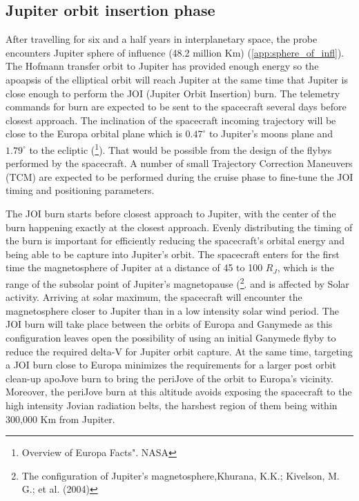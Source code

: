 \subsection{Jupiter orbit insertion phase}
After travelling for six and a half years in interplanetary space, the probe encounters Jupiter sphere of influence (48.2 million Km) (\ref{app:sphere_of_infl}). The Hofmann transfer orbit to Jupiter has provided enough energy so the apoapsis of the elliptical orbit will reach Jupiter at the same time that Jupiter is close enough to perform the JOI (Jupiter Orbit Insertion) burn. The telemetry commands for burn are expected to be sent to the spacecraft several days before closest approach. The inclination of the spacecraft incoming trajectory will be close to the Europa orbital plane which is $0.47^\circ$ to Jupiter’s moons plane and $1.79^\circ$ to the ecliptic (\footnote{Overview of Europa Facts". NASA}). That would be possible from the design of the flybys performed by the spacecraft. A number of small Trajectory Correction Maneuvers (TCM) are expected to be performed during the cruise phase to fine-tune the JOI timing and positioning parameters.

The JOI burn starts before closest approach to Jupiter, with the center of the burn happening exactly at the closest approach. Evenly distributing the timing of the burn is important for efficiently reducing the spacecraft’s orbital energy and being able to be capture into Jupiter's orbit. The spacecraft enters for the first time the magnetosphere of Jupiter at a distance of 45 to 100 $R_J$, which is the range of the subsolar point of Jupiter’s magnetopause (\footnote{The configuration of Jupiter's magnetosphere,Khurana, K.K.; Kivelson, M. G.; et al. (2004)}. and is affected by Solar activity. Arriving at solar maximum, the spacecraft will encounter the magnetosphere closer to Jupiter than in a low intensity solar wind period. The JOI burn will take place between the orbits of Europa and Ganymede as this configuration leaves open the possibility of using an initial Ganymede flyby to reduce the required delta-V for Jupiter orbit capture. At the same time, targeting a JOI burn close to Europa minimizes the requirements for a larger post orbit clean-up apoJove burn to bring the periJove of the orbit to Europa’s vicinity. Moreover, the periJove burn at this altitude avoids exposing the spacecraft to the high intensity Jovian radiation belts, the harshest region of them being within 300,000 Km from Jupiter\cite{jupiter_radiation_harsh}.

